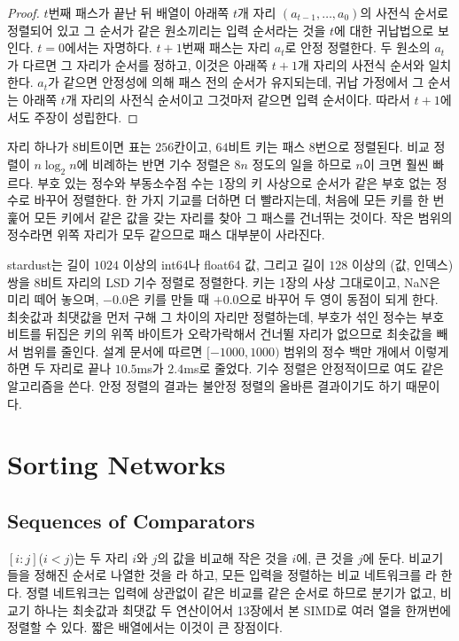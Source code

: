 \begin{proof}
$t$번째 패스가 끝난 뒤 배열이 아래쪽 $t$개 자리 $(a_{t-1},\dots,a_0)$의 사전식 순서로 정렬되어 있고 그 순서가 같은 원소끼리는 입력 순서라는 것을 $t$에 대한 귀납법으로 보인다. $t=0$에서는 자명하다. $t+1$번째 패스는 자리 $a_t$로 안정 정렬한다. 두 원소의 $a_t$가 다르면 그 자리가 순서를 정하고, 이것은 아래쪽 $t+1$개 자리의 사전식 순서와 일치한다. $a_t$가 같으면 안정성에 의해 패스 전의 순서가 유지되는데, 귀납 가정에서 그 순서는 아래쪽 $t$개 자리의 사전식 순서이고 그것마저 같으면 입력 순서이다. 따라서 $t+1$에서도 주장이 성립한다.
\end{proof}

자리 하나가 $8$비트이면 표는 $256$칸이고, $64$비트 키는 패스 $8$번으로 정렬된다. 비교 정렬이 $n\log_2n$에 비례하는 반면 기수 정렬은 $8n$ 정도의 일을 하므로 $n$이 크면 훨씬 빠르다. 부호 있는 정수와 부동소수점 수는 1장의 키 사상으로 순서가 같은 부호 없는 정수로 바꾸어 정렬한다. 한 가지 기교를 더하면 더 빨라지는데, 처음에 모든 키를 한 번 훑어 모든 키에서 같은 값을 갖는 자리를 찾아 그 패스를 건너뛰는 것이다. 작은 범위의 정수라면 위쪽 자리가 모두 같으므로 패스 대부분이 사라진다.

\begin{instardust}
stardust는 길이 $1024$ 이상의 int64나 float64 값, 그리고 길이 $128$ 이상의 (값, 인덱스) 쌍을 $8$비트 자리의 LSD 기수 정렬로 정렬한다. 키는 1장의 사상 그대로이고, NaN은 미리 떼어 놓으며, $-0.0$은 키를 만들 때 $+0.0$으로 바꾸어 두 영이 동점이 되게 한다. 최솟값과 최댓값을 먼저 구해 그 차이의 자리만 정렬하는데, 부호가 섞인 정수는 부호 비트를 뒤집은 키의 위쪽 바이트가 오락가락해서 건너뛸 자리가 없으므로 최솟값을 빼서 범위를 줄인다. 설계 문서에 따르면 $[-1000,1000)$ 범위의 정수 백만 개에서 이렇게 하면 두 자리로 끝나 $10.5$ms가 $2.4$ms로 줄었다. 기수 정렬은 안정적이므로 여도 같은 알고리즘을 쓴다. 안정 정렬의 결과는 불안정 정렬의 올바른 결과이기도 하기 때문이다.
\end{instardust}

\section{Sorting Networks}
\label{sec:sorting-networks}

\subsection{Sequences of Comparators}

 $[i:j]$($i<j$)는 두 자리 $i$와 $j$의 값을 비교해 작은 것을 $i$에, 큰 것을 $j$에 둔다. 비교기들을 정해진 순서로 나열한 것을 라 하고, 모든 입력을 정렬하는 비교 네트워크를 라 한다. 정렬 네트워크는 입력에 상관없이 같은 비교를 같은 순서로 하므로 분기가 없고, 비교기 하나는 최솟값과 최댓값 두 연산이어서 13장에서 본 SIMD로 여러 열을 한꺼번에 정렬할 수 있다. 짧은 배열에서는 이것이 큰 장점이다.

